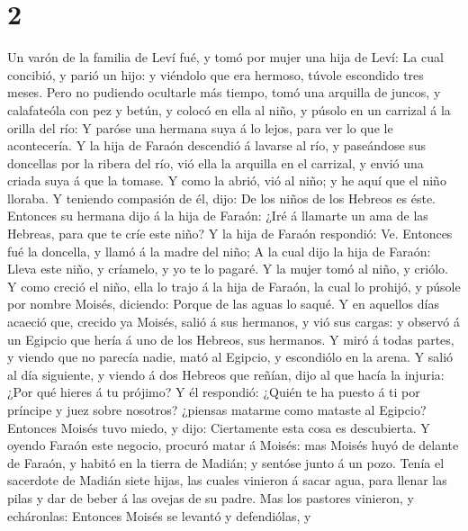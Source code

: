 \hypertarget{section-1}{%
\section{2}\label{section-1}}

 Un varón de la familia de Leví fué, y tomó por mujer una
hija de Leví:  La cual concibió, y parió un hijo: y
viéndolo que era hermoso, túvole escondido tres meses. 
Pero no pudiendo ocultarle más tiempo, tomó una arquilla de juncos, y
calafateóla con pez y betún, y colocó en ella al niño, y púsolo en un
carrizal á la orilla del río:  Y paróse una hermana suya á
lo lejos, para ver lo que le acontecería.  Y la hija de
Faraón descendió á lavarse al río, y paseándose sus doncellas por la
ribera del río, vió ella la arquilla en el carrizal, y envió una criada
suya á que la tomase.  Y como la abrió, vió al niño; y he
aquí que el niño lloraba. Y teniendo compasión de él, dijo: De los niños
de los Hebreos es éste.  Entonces su hermana dijo á la
hija de Faraón: ¿Iré á llamarte un ama de las Hebreas, para que te críe
este niño?  Y la hija de Faraón respondió: Ve. Entonces
fué la doncella, y llamó á la madre del niño;  A la cual
dijo la hija de Faraón: Lleva este niño, y críamelo, y yo te lo pagaré.
Y la mujer tomó al niño, y criólo.  Y como creció el
niño, ella lo trajo á la hija de Faraón, la cual lo prohijó, y púsole
por nombre Moisés, diciendo: Porque de las aguas lo saqué.
 Y en aquellos días acaeció que, crecido ya Moisés, salió
á sus hermanos, y vió sus cargas: y observó á un Egipcio que hería á uno
de los Hebreos, sus hermanos.  Y miró á todas partes, y
viendo que no parecía nadie, mató al Egipcio, y escondiólo en la arena.
 Y salió al día siguiente, y viendo á dos Hebreos que
reñían, dijo al que hacía la injuria: ¿Por qué hieres á tu prójimo?
 Y él respondió: ¿Quién te ha puesto á ti por príncipe y
juez sobre nosotros? ¿piensas matarme como mataste al Egipcio? Entonces
Moisés tuvo miedo, y dijo: Ciertamente esta cosa es descubierta.
 Y oyendo Faraón este negocio, procuró matar á Moisés:
mas Moisés huyó de delante de Faraón, y habitó en la tierra de Madián; y
sentóse junto á un pozo.  Tenía el sacerdote de Madián
siete hijas, las cuales vinieron á sacar agua, para llenar las pilas y
dar de beber á las ovejas de su padre.  Mas los pastores
vinieron, y echáronlas: Entonces Moisés se levantó y defendiólas, y
